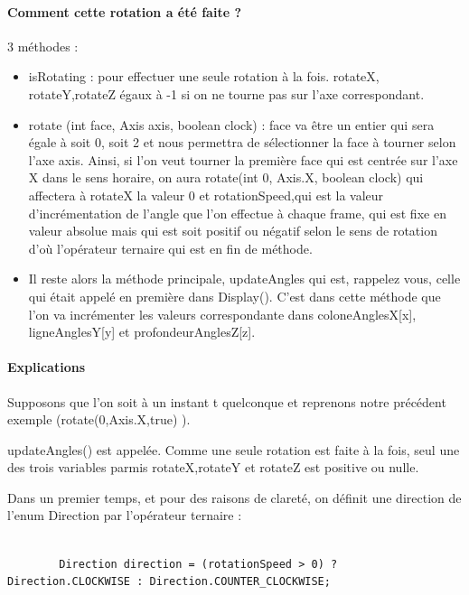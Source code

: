 \paragraph{Comment cette rotation a été faite ?}
3 méthodes :
\begin{itemize}
    \item isRotating : pour effectuer une seule rotation à la fois. rotateX, rotateY,rotateZ égaux à -1 si on ne tourne pas sur l’axe correspondant.
    \item rotate (int face, Axis axis, boolean clock) :
face va être un entier qui sera égale à soit 0, soit 2 et nous permettra de sélectionner la face à tourner selon l’axe axis. Ainsi, si l’on veut tourner la première face qui est centrée sur l’axe X dans le sens horaire, on aura rotate(int 0, Axis.X, boolean clock) qui affectera à rotateX la valeur 0 et rotationSpeed,qui est la valeur d’incrémentation de l’angle que l’on effectue à chaque frame, qui est fixe en valeur absolue mais qui est soit positif ou négatif selon le sens de rotation d’où l’opérateur ternaire qui est en fin de méthode.
    \item Il reste alors la méthode principale, updateAngles qui est, rappelez vous, celle qui était appelé en première dans Display(). C'est dans cette méthode que l'on va incrémenter les valeurs correspondante dans 
coloneAnglesX[x], ligneAnglesY[y] et profondeurAnglesZ[z].
\end{itemize}

\paragraph{Explications}
Supposons que l’on soit à un instant t quelconque et reprenons notre précédent exemple (rotate(0,Axis.X,true) ).

updateAngles() est appelée. Comme une seule rotation est faite à la fois, seul une des trois variables parmis rotateX,rotateY et rotateZ est positive ou nulle.

Dans un premier temps, et pour des raisons de clareté, on définit une direction de l’enum Direction par l’opérateur ternaire :

\begin{lstlisting}[frame=single]  % Start your code-block

        Direction direction = (rotationSpeed > 0) ? Direction.CLOCKWISE : Direction.COUNTER_CLOCKWISE;

\end{lstlisting}

